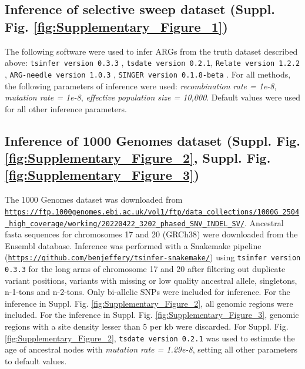 \documentclass[unnumsec,webpdf,contemporary,large,namedate]{oup-authoring-template}%
\begin{document}
\subsection{Inference of selective sweep dataset (Suppl. Fig.
    \ref{fig:Supplementary_Figure_1})} The following software were used to infer
ARGs from the truth dataset described above: \texttt{tsinfer version 0.3.3}
\citep{kelleher2019inferring}, \texttt{tsdate version 0.2.1}, 
\texttt{Relate version 1.2.2} \citep{speidel2019method}, 
\texttt{ARG-needle version 1.0.3} \citep{zhang2023biobank},
\texttt{SINGER version 0.1.8-beta} \citep{deng2024robust}.
For all
methods, the following parameters of inference were used: \textit{recombination
    rate = 1e-8}, \textit{mutation rate = 1e-8}, \textit{effective population size
    = 10,000}. Default values were used for all other inference parameters.

\subsection{Inference of 1000 Genomes dataset (Suppl. Fig.
\ref{fig:Supplementary_Figure_2}, Suppl. Fig.
\ref{fig:Supplementary_Figure_3})} The 1000 Genomes dataset was downloaded from
\texttt{\url{https://ftp.1000genomes.ebi.ac.uk/vol1/ftp/data_collections/1000G_2504_high_coverage/working/20220422_3202_phased_SNV_INDEL_SV/}}.
Ancestral fasta sequences for chromosomes 17 and 20 (GRCh38) were downloaded
from the Ensembl database. Inference was performed with a Snakemake pipeline
(\texttt{\url{https://github.com/benjeffery/tsinfer-snakemake/}}) using
\texttt{tsinfer version 0.3.3} for the long arms of chromosome 17 and 20 after
filtering out duplicate variant positions, variants with missing or low quality
ancestral allele, singletons, n-1-tons and n-2-tons. Only bi-allelic SNPs were
included for inference. For the inference in Suppl. Fig.
\ref{fig:Supplementary_Figure_2}, all genomic regions were included. For the
inference in Suppl. Fig. \ref{fig:Supplementary_Figure_3}, genomic regions with
a site density lesser than 5 per kb were discarded. For Suppl. Fig.
\ref{fig:Supplementary_Figure_2}, \texttt{tsdate version 0.2.1} was used to
estimate the age of ancestral nodes with \textit{mutation rate = 1.29e-8},
setting all other parameters to default values. 
\end{document}
